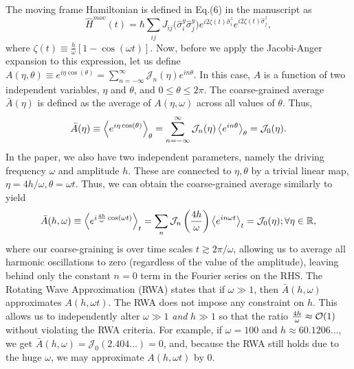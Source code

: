 \documentclass[aps,prb,reprint,showpacs,floatfix,superscriptaddress, onecolumn, nofootinbib, 9pt]{revtex4-2}
\begin{document}
\begin{enumerate}
{    The moving frame Hamiltonian is defined in Eq.(6) in the manuscript as
    \begin{equation}
        \hat{H}^{mov}(t) = \hbar\sum_{ij} J_{ij} \Big(\hat{\sigma}^y_i\hat{\sigma}^y_j\Big) e^{i 2\zeta(t)\hat{\sigma}^z_i}  e^{i 2\zeta(t) \hat{\sigma}^z_j},
        \label{eq:hmov}
    \end{equation}
    where $\zeta(t)\equiv \frac{h}{\omega}[1-\cos(\omega t)]$. Now, before we apply the Jacobi-Anger expansion to this expression, let us define $ A(\eta,\theta)\equiv\displaystyle e^{i\eta \cos(\theta)} = \sum_{n=-\infty}^{\infty} \mathcal{J}_n(\eta)e^{in\theta} $. In this case, $A$ is a function of two independent variables, $\eta$ and $\theta$, and $0\leq\theta\leq 2\pi$. The coarse-grained average $\bar{A}(\eta)$ is defined as the average of $A(\eta, \omega)$ across all values of $\theta$. Thus,
    \begin{equation}
    \bar{A}(\eta) \equiv \expval{e^{i\eta\cos(\theta)}}_{\theta} = \sum_{n=-\infty}^{\infty} \mathcal{J}_n(\eta) \expval{e^{in\theta}}_{\theta} =\mathcal{J}_0(\eta).
    \end{equation}
In the paper, we also have two independent parameters, namely the driving frequency $\omega$ and amplitude $h$. These are connected to $\eta, \theta$ by a trivial linear map, $\eta=4h/\omega, \theta=\omega t$. Thus, we can obtain the coarse-grained average similarly to yield
    \begin{equation}
        \bar{A}(h,\omega) \equiv \expval{e^{i\frac{4h}{\omega}\cos(\omega t)}}_t = \sum_n\mathcal{J}_n\left(\frac{4h}{\omega}\right)\expval{e^{i n \omega t}}_t = \mathcal{J}_0(\eta) ;  \forall{\eta}\in\mathbb{R},
        \label{eq:jacang}
    \end{equation}
where our coarse-graining is over time scales $t\gtrsim 2\pi/\omega$, allowing us to average all harmonic oscillations to zero (regardless of the value of the amplitude), leaving behind only the constant $n=0$ term in the Fourier series on the RHS. The Rotating Wave Approximation (RWA) states that if $\omega \gg 1$, then  $\bar{A}(h,\omega)$ approximates $A(h, \omega t)$. The RWA does not impose any constraint on $h$.
    This allows us to independently alter $\omega \gg 1$ \emph{and} $h \gg 1$ so that the ratio $\frac{4h}{\omega} \approx \order{1}$ without violating the RWA criteria. For example, if $\omega=100$ and $h\approx 60.1206\dots$, we get $\bar{A}(h,\omega)=\mathcal{J}_0(2.404\dots)=0$, and, because the RWA still holds due to the huge $\omega$, we may approximate $A(h,\omega t)$ by $0$.

}
\end{enumerate}
\end{document}
